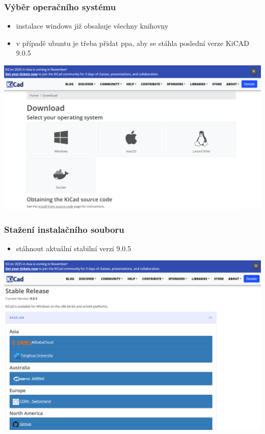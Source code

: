 \documentclass{beamer}
\newcommand{\kicadVersion}{9.0.5}
\begin{document}
	\begin{frame}
    \frametitle{Výběr operačního systému}
		\small
		\begin{itemize}
			\item instalace windows již obsahuje všechny knihovny
			\item v případě ubuntu je třeba přidat ppa, aby se stáhla poslední verze KiCAD \kicadVersion\
		\end{itemize}
		
		\begin{center}
			\includegraphics[scale=0.3]{obr/kicad_dwnld.png}
		\end{center}
	\end{frame}
	\begin{frame}
    \frametitle{Stažení instalačního souboru}
		\small
		\begin{itemize}
			\item stáhnout aktuální stabilní verzi \kicadVersion\
		\end{itemize}
		
		\begin{center}
			\includegraphics[scale=0.3]{obr/kicad_stbv.png}
		\end{center}
	\end{frame}
\end{document}
